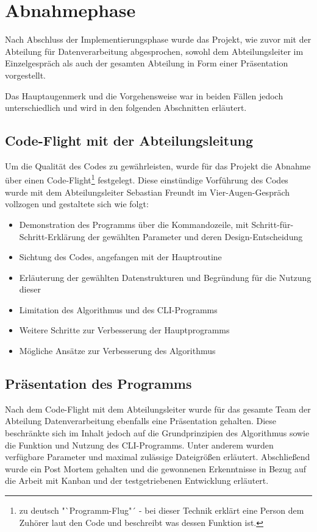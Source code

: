 \section{Abnahmephase}
\label{section:abnahmephase}
Nach Abschluss der Implementierungsphase wurde das Projekt, wie zuvor mit der
Abteilung für Datenverarbeitung abgesprochen, sowohl dem Abteilungsleiter im Einzelgespräch
als auch der gesamten Abteilung in Form einer Präsentation vorgestellt.

Das Hauptaugenmerk und die Vorgehensweise war in beiden Fällen jedoch unterschiedlich
und wird in den folgenden Abschnitten erläutert.

\subsection{Code-Flight mit der Abteilungsleitung}

Um die Qualität des Codes zu gewährleisten, wurde für das Projekt die Abnahme über einen Code-Flight\footnote{zu deutsch "`Programm-Flug"´ - bei dieser Technik erklärt eine Person dem Zuhörer laut den Code und beschreibt was dessen Funktion ist.} festgelegt. Diese einstündige
Vorführung des Codes wurde mit dem Abteilungsleiter Sebastian Freundt im
Vier-Augen-Gespräch vollzogen und gestaltete sich wie folgt:

\begin{itemize}
    \item Demonstration des Programms über die Kommandozeile, mit Schritt-für-Schritt-Erklärung der gewählten Parameter und deren Design-Entscheidung
    \item Sichtung des Codes, angefangen mit der Hauptroutine
    \item Erläuterung der gewählten Datenstrukturen und Begründung für die Nutzung dieser
    \item Limitation des Algorithmus und des CLI-Programms
    \item Weitere Schritte zur Verbesserung der Hauptprogramms
    \item Mögliche Ansätze zur Verbesserung des Algorithmus
\end{itemize}

\subsection{Präsentation des Programms}

Nach dem Code-Flight mit dem Abteilungsleiter wurde für das gesamte Team der Abteilung Datenverarbeitung ebenfalls eine Präsentation gehalten.
Diese beschränkte sich im Inhalt jedoch auf die Grundprinzipien des Algorithmus sowie
die Funktion und Nutzung des CLI-Programms. Unter anderem wurden verfügbare
Parameter und maximal zulässige Dateigrößen erläutert.
Abschließend wurde ein Post Mortem gehalten und die gewonnenen Erkenntnisse in Bezug auf die Arbeit mit Kanban und der testgetriebenen Entwicklung erläutert.
